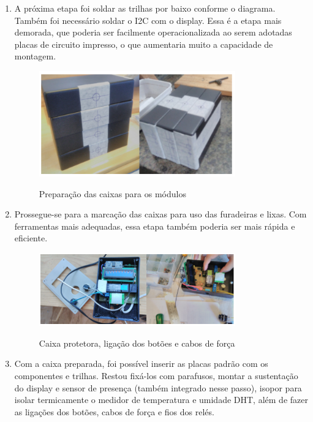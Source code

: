 \begin{enumerate}
	\item A próxima etapa foi soldar as trilhas por baixo conforme o diagrama. Também foi necessário soldar o I2C com o display. Essa é a etapa mais demorada, que poderia ser facilmente operacionalizada ao serem adotadas placas de circuito impresso, o que aumentaria muito a capacidade de montagem.

	\begin{figure}[H]
		\centering
		\caption{Preparação das caixas para os módulos}
		\includegraphics[width=0.8\textwidth]{PrepCaixasModulos}
		\label{fig:PrepCaixasModulos}
	\end{figure}

	\item Prossegue-se para a marcação das caixas para uso das furadeiras e lixas. Com ferramentas mais adequadas, essa etapa também poderia ser mais rápida e eficiente.

	\begin{figure}[H]
		\centering
		\caption{Caixa protetora, ligação dos botões e cabos de força}
		\includegraphics[width=0.8\textwidth]{BotoesCabosForca}
		\label{fig:BotoesCabosForca}
	\end{figure}

	\item Com a caixa preparada, foi possível inserir as placas padrão com os componentes e trilhas. Restou fixá-los com parafusos, montar a sustentação do display e sensor de presença (também integrado nesse passo), isopor para isolar termicamente o medidor de temperatura e umidade DHT, além de fazer as ligações dos botões, cabos de força e fios dos relés.


\end{enumerate}
